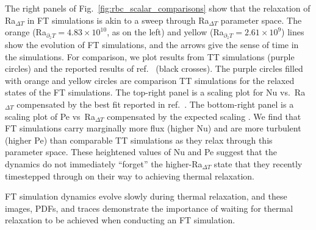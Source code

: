 \documentclass[aps, pre, onecolumn, nofootinbib, notitlepage, groupedaddress, amsfonts, amssymb, amsmath, longbibliography, superscriptaddress]{revtex4-1}
\begin{document}
The right panels of Fig.~\ref{fig:rbc_scalar_comparisons} show that the relaxation of Ra$_{\Delta T}$ in FT simulations is akin to a sweep through Ra$_{\Delta T}$ parameter space.
The orange (Ra$_{\partial_z T} = 4.83 \times 10^{10}$, as on the left) and yellow (Ra$_{\partial_z T} = 2.61 \times 10^{9}$) lines show the evolution of FT simulations, and the arrows give the sense of time in the simulations.
For comparison, we plot results from TT simulations (purple circles) and the reported results of ref.~\cite{zhu&all2018} (black crosses).
The purple circles filled with orange and yellow circles are comparison TT simulations for the relaxed states of the FT simulations.
The top-right panel is a scaling plot for Nu vs.~Ra$_{\Delta T}$ compensated by the best fit reported in ref.~\cite{johnston&doering2009}.
The bottom-right panel is a scaling plot of Pe vs~Ra$_{\Delta T}$ compensated by the expected scaling \cite{ahlers&all2009}.
We find that FT simulations carry marginally more flux (higher Nu) and are more turbulent (higher Pe) than comparable TT simulations as they relax through this parameter space.
These heightened values of Nu and Pe suggest that the dynamics do not immediately ``forget'' the higher-Ra$_{\Delta T}$ state that they recently timestepped through on their way to achieving thermal relaxation.

FT simulation dynamics evolve slowly during thermal relaxation, and these images, PDFs, and traces demonstrate the importance of waiting for thermal relaxation to be achieved when conducting an FT simulation.
\end{document}
